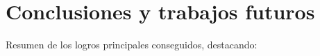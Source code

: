 \chapter{Conclusiones y trabajos futuros}

Resumen de los logros principales conseguidos, destacando: